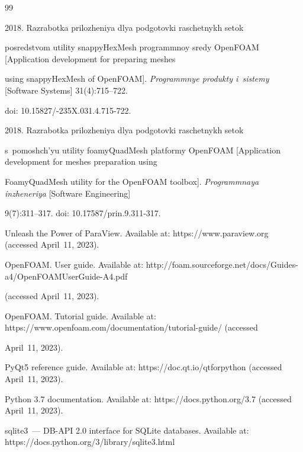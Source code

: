 {{\begin{thebibliography}{99}


 2018. Razrabotka prilozheniya dlya podgotovki raschetnykh setok 


posredstvom utility snappyHexMesh programmnoy sredy OpenFOAM [Application development for preparing meshes 


using snappyHexMesh of OpenFOAM]. \textit{Programmnye produkty i~sistemy} [Software Systems] 31(4):715--722. 


doi: 10.15827\!/-235X.031.4.715-722. 




 2018. Razrabotka prilozheniya dlya podgotovki raschetnykh setok 


s~pomoshch'yu utility foamyQuadMesh platformy OpenFOAM [Application development for meshes preparation using 


FoamyQuadMesh utility for the OpenFOAM toolbox]. \textit{Programmnaya inzheneriya} [Software Engineering] 


9(7):311--317. doi: 10.17587\!/\!prin.9.311-317.




Unleash the Power of ParaView. Available at: {\sf https://www.paraview.org} (accessed April~11, 2023).




OpenFOAM. User guide. Available at: {\sf http://foam.sourceforge.net/docs/Guides-a4/OpenFOAMUserGuide-A4.pdf} 


(accessed April~11, 2023).




OpenFOAM. Tutorial guide. Available at: {\sf https://www.openfoam.com/\linebreak documentation/tutorial-guide/} (accessed 


April~11, 2023). 




PyQt5 reference guide. Available at: {\sf https://doc.qt.io/qtforpython} (accessed April~11, 2023).




Python 3.7 documentation. Available at: {\sf https://docs.python.org/3.7} (accessed April~11, 2023).




sqlite3~--- DB-API 2.0 interface for SQLite databases. Available at: {\sf https://\linebreak docs.python.org/3/library/sqlite3.html} 



\end{thebibliography}}}
